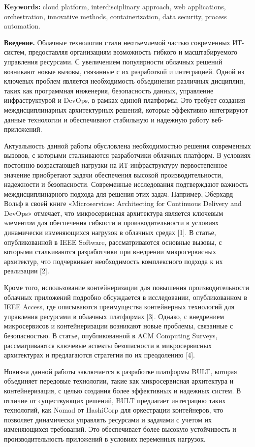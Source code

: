 {\bfseries Keywords:} cloud platform, interdisciplinary approach, web
applications, orchestration, innovative methods, containerization, data
security, process automation.

\begin{multicols}{2}
{\bfseries Введение.} Облачные технологии стали неотъемлемой частью
современных ИТ-систем, предоставляя организациям возможность гибкого и
масштабируемого управления ресурсами. С увеличением популярности
облачных решений возникают новые вызовы, связанные с их разработкой и
интеграцией. Одной из ключевых проблем является необходимость
объединения различных дисциплин, таких как программная инженерия,
безопасность данных, управление инфраструктурой и DevOps, в рамках
единой платформы. Это требует создания междисциплинарных архитектурных
решений, которые эффективно интегрируют данные технологии и обеспечивают
стабильную и надежную работу веб-приложений.

Актуальность данной работы обусловлена необходимостью решения
современных вызовов, с которыми сталкиваются разработчики облачных
платформ. В условиях постоянно возрастающей нагрузки на
ИТ-инфраструктуру первостепенное значение приобретают задачи обеспечения
высокой производительности, надежности и безопасности. Современные
исследования подтверждают важность междисциплинарного подхода для
решения этих задач. Например, Эберхард Вольф в своей книге
«Microservices: Architecting for Continuous Delivery and DevOps»
отмечает, что микросервисная архитектура является ключевым элементом для
обеспечения гибкости и производительности в условиях динамически
изменяющихся нагрузок в облачных средах {[}1{]}. В статье,
опубликованной в IEEE Software, рассматриваются основные вызовы, с
которыми сталкиваются разработчики при внедрении микросервисных
архитектур, что подчеркивает необходимость комплексного подхода к их
реализации {[}2{]}.

Кроме того, использование контейнеризации для повышения
производительности облачных приложений подробно обсуждается в
исследовании, опубликованном в IEEE Access, где описываются преимущества
контейнерных технологий для управления ресурсами в облачных платформах
{[}3{]}. Однако, с внедрением микросервисов и контейнеризации возникают
новые проблемы, связанные с безопасностью. В статье, опубликованной в
ACM Computing Surveys, рассматриваются ключевые аспекты безопасности в
микросервисных архитектурах и предлагаются стратегии по их преодолению
{[}4{]}.

Новизна данной работы заключается в разработке платформы BULT, которая
объединяет передовые технологии, такие как микросервисная архитектура и
контейнеризация, с целью создания более эффективных и надежных систем. В
отличие от существующих решений, BULT предлагает интеграцию таких
технологий, как Nomad от HashiCorp для оркестрации контейнеров, что
позволяет динамически управлять ресурсами и задачами с учетом их
изменяющихся требований. Это обеспечивает более высокую устойчивость и
производительность приложений в условиях переменных нагрузок.


\end{multicols}
